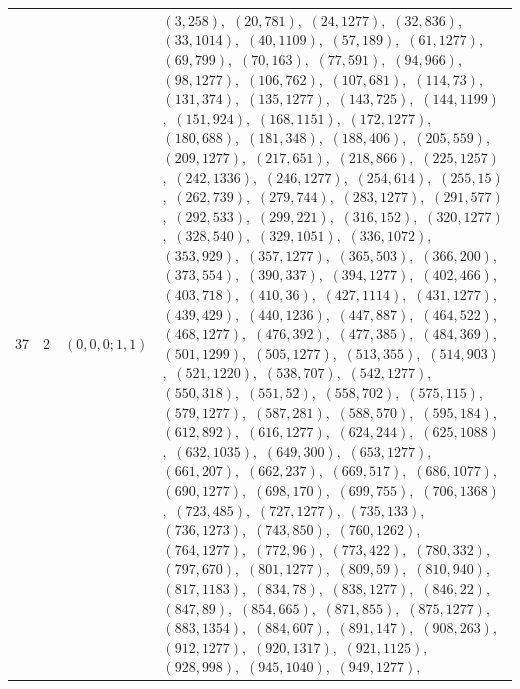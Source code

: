 \documentclass[11pt]{article}
\begin{document}
\begin{longtable}{@{}rrl>{\raggedright\arraybackslash}p{}@{}}
37 & 2 & $(0,0,0;1,1)$ & $(3,258)$,\allowbreak\ $(20,781)$,\allowbreak\ $(24,1277)$,\allowbreak\ $(32,836)$,\allowbreak\ $(33,1014)$,\allowbreak\ $(40,1109)$,\allowbreak\ $(57,189)$,\allowbreak\ $(61,1277)$,\allowbreak\ $(69,799)$,\allowbreak\ $(70,163)$,\allowbreak\ $(77,591)$,\allowbreak\ $(94,966)$,\allowbreak\ $(98,1277)$,\allowbreak\ $(106,762)$,\allowbreak\ $(107,681)$,\allowbreak\ $(114,73)$,\allowbreak\ $(131,374)$,\allowbreak\ $(135,1277)$,\allowbreak\ $(143,725)$,\allowbreak\ $(144,1199)$,\allowbreak\ $(151,924)$,\allowbreak\ $(168,1151)$,\allowbreak\ $(172,1277)$,\allowbreak\ $(180,688)$,\allowbreak\ $(181,348)$,\allowbreak\ $(188,406)$,\allowbreak\ $(205,559)$,\allowbreak\ $(209,1277)$,\allowbreak\ $(217,651)$,\allowbreak\ $(218,866)$,\allowbreak\ $(225,1257)$,\allowbreak\ $(242,1336)$,\allowbreak\ $(246,1277)$,\allowbreak\ $(254,614)$,\allowbreak\ $(255,15)$,\allowbreak\ $(262,739)$,\allowbreak\ $(279,744)$,\allowbreak\ $(283,1277)$,\allowbreak\ $(291,577)$,\allowbreak\ $(292,533)$,\allowbreak\ $(299,221)$,\allowbreak\ $(316,152)$,\allowbreak\ $(320,1277)$,\allowbreak\ $(328,540)$,\allowbreak\ $(329,1051)$,\allowbreak\ $(336,1072)$,\allowbreak\ $(353,929)$,\allowbreak\ $(357,1277)$,\allowbreak\ $(365,503)$,\allowbreak\ $(366,200)$,\allowbreak\ $(373,554)$,\allowbreak\ $(390,337)$,\allowbreak\ $(394,1277)$,\allowbreak\ $(402,466)$,\allowbreak\ $(403,718)$,\allowbreak\ $(410,36)$,\allowbreak\ $(427,1114)$,\allowbreak\ $(431,1277)$,\allowbreak\ $(439,429)$,\allowbreak\ $(440,1236)$,\allowbreak\ $(447,887)$,\allowbreak\ $(464,522)$,\allowbreak\ $(468,1277)$,\allowbreak\ $(476,392)$,\allowbreak\ $(477,385)$,\allowbreak\ $(484,369)$,\allowbreak\ $(501,1299)$,\allowbreak\ $(505,1277)$,\allowbreak\ $(513,355)$,\allowbreak\ $(514,903)$,\allowbreak\ $(521,1220)$,\allowbreak\ $(538,707)$,\allowbreak\ $(542,1277)$,\allowbreak\ $(550,318)$,\allowbreak\ $(551,52)$,\allowbreak\ $(558,702)$,\allowbreak\ $(575,115)$,\allowbreak\ $(579,1277)$,\allowbreak\ $(587,281)$,\allowbreak\ $(588,570)$,\allowbreak\ $(595,184)$,\allowbreak\ $(612,892)$,\allowbreak\ $(616,1277)$,\allowbreak\ $(624,244)$,\allowbreak\ $(625,1088)$,\allowbreak\ $(632,1035)$,\allowbreak\ $(649,300)$,\allowbreak\ $(653,1277)$,\allowbreak\ $(661,207)$,\allowbreak\ $(662,237)$,\allowbreak\ $(669,517)$,\allowbreak\ $(686,1077)$,\allowbreak\ $(690,1277)$,\allowbreak\ $(698,170)$,\allowbreak\ $(699,755)$,\allowbreak\ $(706,1368)$,\allowbreak\ $(723,485)$,\allowbreak\ $(727,1277)$,\allowbreak\ $(735,133)$,\allowbreak\ $(736,1273)$,\allowbreak\ $(743,850)$,\allowbreak\ $(760,1262)$,\allowbreak\ $(764,1277)$,\allowbreak\ $(772,96)$,\allowbreak\ $(773,422)$,\allowbreak\ $(780,332)$,\allowbreak\ $(797,670)$,\allowbreak\ $(801,1277)$,\allowbreak\ $(809,59)$,\allowbreak\ $(810,940)$,\allowbreak\ $(817,1183)$,\allowbreak\ $(834,78)$,\allowbreak\ $(838,1277)$,\allowbreak\ $(846,22)$,\allowbreak\ $(847,89)$,\allowbreak\ $(854,665)$,\allowbreak\ $(871,855)$,\allowbreak\ $(875,1277)$,\allowbreak\ $(883,1354)$,\allowbreak\ $(884,607)$,\allowbreak\ $(891,147)$,\allowbreak\ $(908,263)$,\allowbreak\ $(912,1277)$,\allowbreak\ $(920,1317)$,\allowbreak\ $(921,1125)$,\allowbreak\ $(928,998)$,\allowbreak\ $(945,1040)$,\allowbreak\ $(949,1277)$,\allowbreak\ 
\end{longtable}
\end{document}
